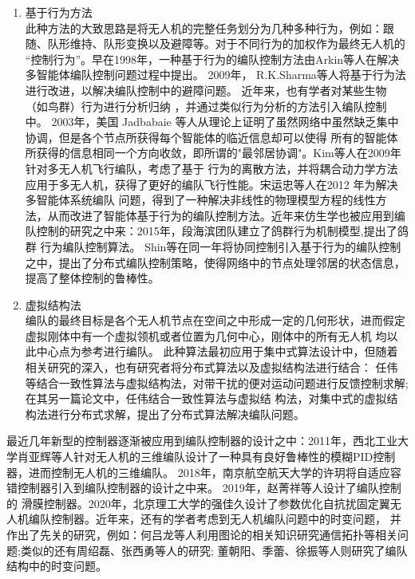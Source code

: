 \begin{enumerate}
    \item 基于行为方法\\
        此种方法的大致思路是将无人机的完整任务划分为几种多种行为，例如：跟随、队形维持、队形变换以及避障等。对于不同行为的加权作为最终无人机的
        “控制行为”。早在1998年，一种基于行为的编队控制方法由Arkin等人在解决多智能体编队控制问题过程中提出。\cite{Balch1998Behavior} 2009年，
        R.K.Sharma等人将基于行为法进行改进，以解决编队控制中的避障问题。\cite{Sharma2009Collision} 近年来，也有学者对某些生物（如鸟群）行为进行分析归纳
        ，并通过类似行为分析的方法引入编队控制中。
        2003年，美国 Jadbabaie 等人从理论上证明了虽然网络中虽然缺乏集中协调，但是各个节点所获得每个智能体的临近信息却可以使得
        所有的智能体所获得的信息相同一个方向收敛，即所谓的"最邻居协调"。\cite{Jadbabaie2003Coordination}Kim等人在2009年针对多无人机飞行编队，考虑了基于
        行为的离散方法，并将耦合动力学方法应用于多无人机，获得了更好的编队飞行性能。\cite{Kim2009}宋运忠等人在2012 年为解决多智能体系统编队
        问题，得到了一种解决非线性的物理模型方程的线性方法，从而改进了智能体基于行为的编队控制方法。\cite{SongYunZhong2012}近年来仿生学也被应用到编队控制的研究之中来：2015年，段海滨团队建立了鸽群行为机制模型,提出了鸽群
        行为编队控制算法。\cite{DuanHaiBin2015}
        Shin等在同一年将协同控制引入基于行为的编队控制之中，提出了分布式编队控制策略，使得网络中的节点处理邻居的状态信息，提高了整体控制的鲁棒性。\cite{Jongho2015}
    \item 虚拟结构法\\
        编队的最终目标是各个无人机节点在空间之中形成一定的几何形状，进而假定虚拟刚体中有一个虚拟领机或者位置为几何中心，刚体中的所有无人机
        均以此中心点为参考进行编队。\cite{Lewis1997High}
        此种算法最初应用于集中式算法设计中，但随着相关研究的深入，也有研究者将分布式算法以及虚拟结构法进行结合：
        任伟等结合一致性算法与虚拟结构法，对带干扰的便对运动问题进行反馈控制求解\cite{Ren2004Formation};在其另一篇论文中，任伟结合一致性算法与虚拟结
        构法，对集中式的虚拟结构法进行分布式求解，提出了分布式算法解决编队问题。\cite{Ren2004Decentralized}
\end{enumerate}

最近几年新型的控制器逐渐被应用到编队控制器的设计之中：2011年，西北工业大学肖亚辉等人针对无人机的三维编队设计了一种具有良好鲁棒性的模糊PID控制器，进而控制无人机的三维编队。\cite{XiaoYaHui2011}
2018年，南京航空航天大学的许玥将自适应容错控制器引入到编队控制器的设计之中来。\cite{XuYue} 2019年，赵菁祥等人设计了编队控制的
滑膜控制器。2020年，北京理工大学的强佳久设计了参数优化自抗扰固定翼无人机编队控制器。\cite{MengXiuyun2020}近年来，还有的学者考虑到无人机编队问题中的时变问题，
并作出了先关的研究，例如：何吕龙等人利用图论的相关知识研究通信拓扑等相关问题\cite{Helvlong2020};类似的还有周绍磊\cite{Zhoushaolei2020}、张西勇\cite{Zhangxiyong2019}等人的研究;
董朝阳\cite{Dongzhaoyang2020}、季蕾\cite{Jilei2019}、徐振\cite{Xuzhen2019}等人则研究了编队结构中的时变问题。

